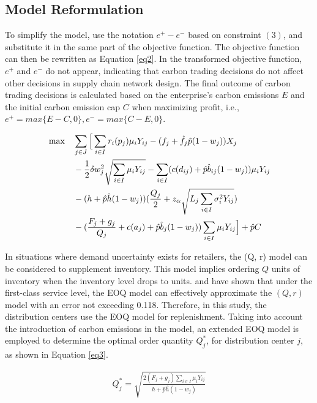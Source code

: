 \documentclass[]{article}
\theoremstyle{plain}%
\theoremstyle{definition}
\theoremstyle{remark}
\theoremstyle{plain}%
\begin{document}
    \subsection{Model Reformulation}
    To simplify the model, use the notation $e^+-e^-$ based on constraint $(3)$, and substitute it in the same part of the objective function. The objective function can then be rewritten as Equation \ref{eq2}. In the transformed objective function, $e^+$ and $e^-$ do not appear, indicating that carbon trading decisions do not affect other decisions in supply chain network design. The final outcome of carbon trading decisions is calculated based on the enterprise's carbon emissions $E$ and the initial carbon emission cap $C$ when maximizing profit, i.e., $e^+=max\{ E-C, 0\},e^-=max\{ C-E, 0\}$.
    
   \begin{align}
    \label{eq2}
    & \max  & &  
    \sum_{j\in J} \Big[ \sum_{i\in I}r_i(p_j)\mu_iY_{ij}-(f_j+\hat{f}_j\hat{p}(1-w_j))X_j \notag \\
     & & &-\frac{1}{2}\delta w^2_j \sqrt{\sum_{i\in I}\mu_iY_{ij}}-\sum_{i\in I}(c(d_{ij})+\hat{p}\hat{b}_{ij}(1-w_j))\mu_iY_{ij}  \notag \\
     & & & -(h+\hat{p}\hat{h}(1-w_j))(\frac{Q_j}{2}+z_{\alpha} \sqrt{L_j\sum_{i\in I}\sigma^2_iY_{ij}}) \notag\\
     & & &-(\frac{F_j+g_j}{Q_j}+c(a_j)+\hat{p}\hat{b}_j(1-w_j))\sum_{i\in I}\mu_iY_{ij} \Big]+\hat{p}C 
\end{align}
    
    In situations where demand uncertainty exists for retailers, the (Q, r) model can be considered to supplement inventory. This model implies ordering $Q$ units of inventory when the inventory level drops to units. \cite{zhang1992properties} and \cite{axsater1996using} have shown that under the first-class service level, the EOQ model can effectively approximate the $(Q, r)$ model with an error not exceeding 0.118. Therefore, in this study, the distribution centers use the EOQ model for replenishment. Taking into account the introduction of carbon emissions in the model, an extended EOQ model is employed to determine the optimal order quantity $Q^*_j$, for distribution center $j$, as shown in Equation \ref{eq3}.
    
    \begin{align}
        \label{eq3}
        Q_j^*=\sqrt{\frac{2(F_j+g_j)\sum_{i\in I}\mu_iY_{ij}}{h+\hat{p}\hat{h}(1-w_j)}}
    \end{align}
    
\end{document}
